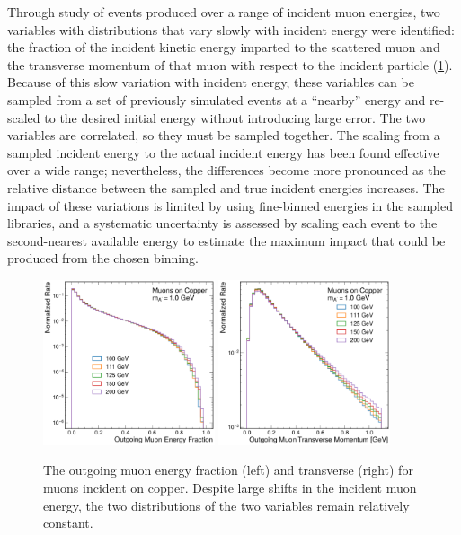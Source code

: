 Through study of \mg events produced over a range of incident muon energies, two variables with distributions that vary slowly with incident energy were identified: the fraction of the incident kinetic energy imparted to the scattered muon and the transverse momentum of that muon with respect to the incident particle (\cref{fig:efrac_pt}). 
Because of this slow variation with incident energy, these variables can be sampled from a set of previously simulated \mg events at a ``nearby'' energy and re-scaled to the desired initial energy without introducing large error. 
The two variables are correlated, so they must be sampled together. 
The scaling from a sampled \mg incident energy to the actual \gf incident energy has been found effective over a wide range; nevertheless, the differences become more pronounced as the relative distance between the sampled and true incident energies increases.
The impact of these variations is limited by using fine-binned energies in the sampled \mg libraries, and a systematic uncertainty is assessed by scaling each event to the second-nearest available energy to estimate the maximum impact that could be produced from the chosen binning. 

\begin{figure}[!htbp]
    \centering
    \includegraphics[width=0.45\textwidth]{figures/muon_energy_comp_efrac.pdf}
    \hspace{0.01\textwidth}
    \includegraphics[width=0.45\textwidth]{figures/muon_energy_comp_pt.pdf}
    \caption[
        Sampling variables used for \dbrem simulation.
    ]{
        The outgoing muon energy fraction (left) and transverse (right) for muons incident on copper. Despite large shifts in the incident muon energy, the two distributions of the two variables remain relatively constant. 
    }
    \label{fig:efrac_pt}
\end{figure}

